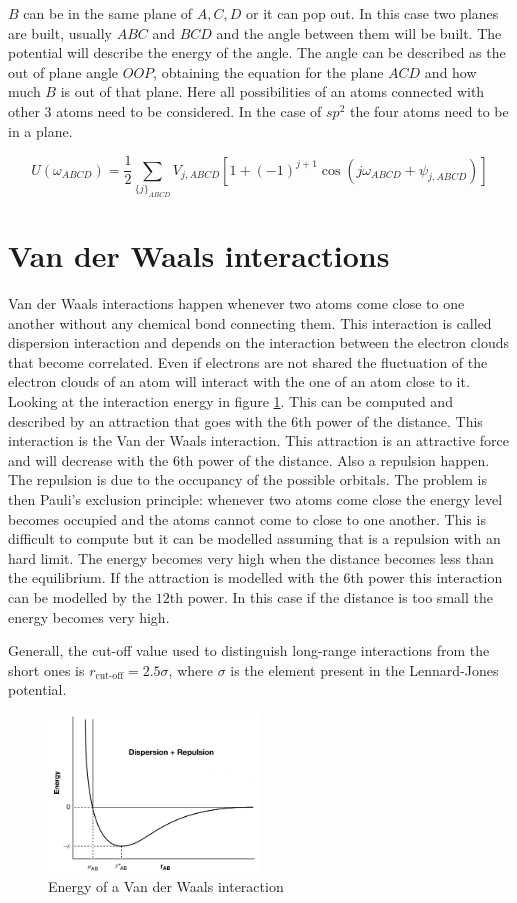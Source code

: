 	$B$ can be in the same plane of $A, C, D$ or it can pop out.
	In this case two planes are built, usually $ABC$ and $BCD$ and the angle between them will be built.
	The potential will describe the energy of the angle.
	The angle can be described as the out of plane angle $OOP$, obtaining the equation for the plane $ACD$ and how much $B$ is out of that plane.
	Here all possibilities of an atoms connected with other $3$ atoms need to be considered.
	In the case of $sp^2$ the four atoms need to be in a plane.

	$$U(\omega_{ABCD}) = \frac{1}{2}\sum\limits_{\{j\}_{ABCD}}V_{j,ABCD}[1+(-1)^{j+1}\cos(j\omega_{ABCD}+\psi_{j,ABCD})]$$

\section{Van der Waals interactions}
Van der Waals interactions happen whenever two atoms come close to one another without any chemical bond connecting them.
This interaction is called dispersion interaction and depends on the interaction between the electron clouds that become correlated.
Even if electrons are not shared the fluctuation of the electron clouds of an atom will interact with the one of an atom close to it.
Looking at the interaction energy in figure \ref{fig:van-der-waals}.
This can be computed and described by an attraction that goes with the $6$th power of the distance.
This interaction is the Van der Waals interaction.
This attraction is an attractive force and will decrease with the $6$th power of the distance.
Also a repulsion happen.
The repulsion is due to the occupancy of the possible orbitals.
The problem is then Pauli's exclusion principle: whenever two atoms come close the energy level becomes occupied and the atoms cannot come to close to one another.
This is difficult to compute but it can be modelled assuming that is a repulsion with an hard limit.
The energy becomes very high when the distance becomes less than the equilibrium.
If the attraction is modelled with the $6$th power this interaction can be modelled by the $12$th power.
In this case if the distance is too small the energy becomes very high.

Generall, the cut-off value used to distinguish long-range interactions from the
short ones is $r_{\text{cut-off}} = 2.5 \sigma$, where $\sigma$ is the element
present in the Lennard-Jones potential.

\begin{figure}[H]
	\centering
	\includegraphics[width=0.5\textwidth]{van-der-waals}
	\caption{Energy of a Van der Waals interaction}
	\label{fig:van-der-waals}
\end{figure}

